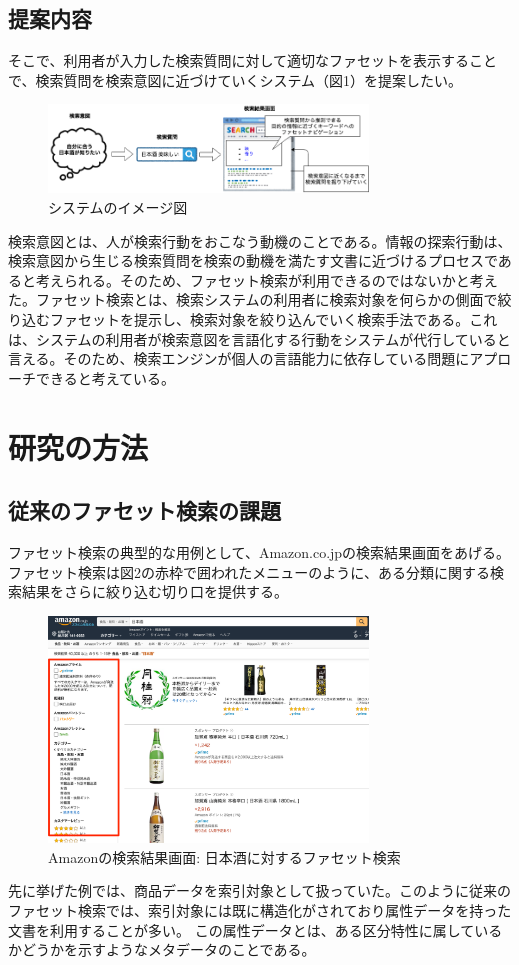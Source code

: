 \documentclass[a4j,10pt, twocolumn]{jarticle} \usepackage[dvipdfmx]{graphicx} \usepackage{amssymb} \usepackage{amsmath}
\begin{document}
\subsection{提案内容}

 そこで、利用者が入力した検索質問に対して適切なファセットを表示することで、検索質問を検索意図に近づけていくシステム（図1）を提案したい。

 \begin{figure}[ht]
   \includegraphics[width=85mm]{./new_ir_with_navi.png}
   \caption{システムのイメージ図}
 \end{figure}
 
 検索意図とは、人が検索行動をおこなう動機のことである。情報の探索行動は、検索意図から生じる検索質問を検索の動機を満たす文書に近づけるプロセスであると考えられる。そのため、ファセット検索が利用できるのではないかと考えた。ファセット検索とは、検索システムの利用者に検索対象を何らかの側面で絞り込むファセットを提示し、検索対象を絞り込んでいく検索手法である\cite{faceted}。これは、システムの利用者が検索意図を言語化する行動をシステムが代行していると言える。そのため、検索エンジンが個人の言語能力に依存している問題にアプローチできると考えている。
\section{研究の方法}
\subsection{従来のファセット検索の課題}
 ファセット検索の典型的な用例として、Amazon.co.jp\cite{amazon}の検索結果画面をあげる。ファセット検索は図2の赤枠で囲われたメニューのように、ある分類に関する検索結果をさらに絞り込む切り口を提供する。
 \begin{figure}[ht]
   \includegraphics[width=85mm]{./amazon.png}
   \caption{Amazonの検索結果画面: 日本酒に対するファセット検索}
 \end{figure}
  先に挙げた例では、商品データを索引対象として扱っていた。このように従来のファセット検索では、索引対象には既に構造化がされており属性データを持った文書を利用することが多い。
  この属性データとは、ある区分特性に属しているかどうかを示すようなメタデータのことである。
\end{document}
